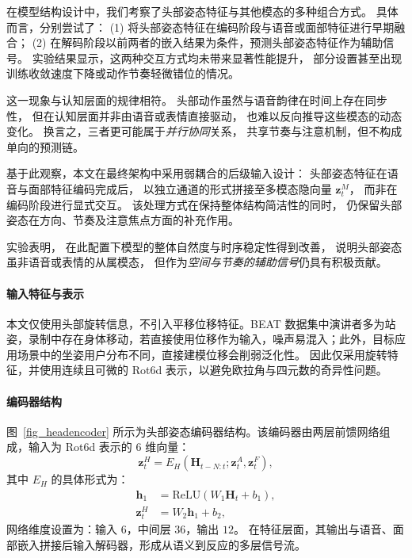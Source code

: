 在模型结构设计中，我们考察了头部姿态特征与其他模态的多种组合方式。%
具体而言，分别尝试了：%
(1) 将头部姿态特征在编码阶段与语音或面部特征进行早期融合；%
(2) 在解码阶段以前两者的嵌入结果为条件，预测头部姿态特征作为辅助信号。%
实验结果显示，这两种交互方式均未带来显著性能提升，%
部分设置甚至出现训练收敛速度下降或动作节奏轻微错位的情况。%

这一现象与认知层面的规律相符。%
头部动作虽然与语音韵律在时间上存在同步性，%
但在认知层面并非由语音或表情直接驱动，%
也难以反向推导这些模态的动态变化。%
换言之，三者更可能属于\emph{并行协同}关系，%
共享节奏与注意机制，但不构成单向的预测链。%

基于此观察，本文在最终架构中采用弱耦合的后级输入设计：%
头部姿态特征在语音与面部特征编码完成后，%
以独立通道的形式拼接至多模态隐向量 $\bm{z}^M_t$，%
而非在编码阶段进行显式交互。%
该处理方式在保持整体结构简洁性的同时，%
仍保留头部姿态在方向、节奏及注意焦点方面的补充作用。%

实验表明，%
在此配置下模型的整体自然度与时序稳定性得到改善，%
说明头部姿态虽非语音或表情的从属模态，%
但作为\emph{空间与节奏的辅助信号}仍具有积极贡献。

\paragraph{输入特征与表示}
本文仅使用头部旋转信息，不引入平移位移特征。BEAT 数据集中演讲者多为站姿，录制中存在身体移动，若直接使用位移作为输入，噪声易混入；此外，目标应用场景中的坐姿用户分布不同，直接建模位移会削弱泛化性。  
因此仅采用旋转特征，并使用连续且可微的 Rot6d 表示，以避免欧拉角与四元数的奇异性问题。

\paragraph{编码器结构}
图~\ref{fig_headencoder} 所示为头部姿态编码器结构。该编码器由两层前馈网络组成，输入为 Rot6d 表示的 6 维向量：
\begin{equation}
\mathbf{z}^{H}_t = E_H(\mathbf{H}_{t-N:t}; \mathbf{z}^A_t, \mathbf{z}^F_t),
\end{equation}
其中 $E_H$ 的具体形式为：
\begin{align}
\mathbf{h}_1 &= \mathrm{ReLU}(W_1 \mathbf{H}_t + b_1), \\
\mathbf{z}^{H}_t &= W_2 \mathbf{h}_1 + b_2,
\end{align}
网络维度设置为：输入 $6$，中间层 $36$，输出 $12$。  
在特征层面，其输出与语音、面部嵌入拼接后输入解码器，形成从语义到反应的多层信号流。

